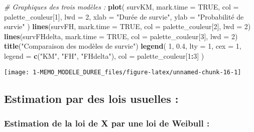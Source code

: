 \documentclass[
]{article}
\newenvironment{Shaded}{\begin{snugshade}}{\end{snugshade}}
\newcommand{\AttributeTok}[1]{\textcolor[rgb]{0.13,0.29,0.53}{#1}}
\newcommand{\CommentTok}[1]{\textcolor[rgb]{0.56,0.35,0.01}{\textit{#1}}}
\newcommand{\ConstantTok}[1]{\textcolor[rgb]{0.56,0.35,0.01}{#1}}
\newcommand{\DecValTok}[1]{\textcolor[rgb]{0.00,0.00,0.81}{#1}}
\newcommand{\FloatTok}[1]{\textcolor[rgb]{0.00,0.00,0.81}{#1}}
\newcommand{\FunctionTok}[1]{\textcolor[rgb]{0.13,0.29,0.53}{\textbf{#1}}}
\newcommand{\NormalTok}[1]{#1}
\newcommand{\SpecialCharTok}[1]{\textcolor[rgb]{0.81,0.36,0.00}{\textbf{#1}}}
\newcommand{\StringTok}[1]{\textcolor[rgb]{0.31,0.60,0.02}{#1}}
\begin{document}
\begin{Shaded}
\begin{Highlighting}[]
\CommentTok{\# Graphiques des trois modèles : }
\FunctionTok{plot}\NormalTok{(}
\NormalTok{  survKM,}
  \AttributeTok{mark.time =} \ConstantTok{TRUE}\NormalTok{,}
  \AttributeTok{col =}\NormalTok{ palette\_couleur[}\DecValTok{1}\NormalTok{],}
  \AttributeTok{lwd =} \DecValTok{2}\NormalTok{,}
  \AttributeTok{xlab =} \StringTok{"Durée de survie"}\NormalTok{,}
  \AttributeTok{ylab =} \StringTok{"Probabilité de survie"}
\NormalTok{)}
\FunctionTok{lines}\NormalTok{(survFH,}
      \AttributeTok{mark.time =} \ConstantTok{TRUE}\NormalTok{,}
      \AttributeTok{col =}\NormalTok{ palette\_couleur[}\DecValTok{2}\NormalTok{],}
      \AttributeTok{lwd =} \DecValTok{2}\NormalTok{)}
\FunctionTok{lines}\NormalTok{(survFHdelta,}
      \AttributeTok{mark.time =} \ConstantTok{TRUE}\NormalTok{,}
      \AttributeTok{col =}\NormalTok{ palette\_couleur[}\DecValTok{3}\NormalTok{],}
      \AttributeTok{lwd =} \DecValTok{2}\NormalTok{)}
\FunctionTok{title}\NormalTok{(}\StringTok{"Comparaison des modèles de survie"}\NormalTok{)}
\FunctionTok{legend}\NormalTok{(}
  \DecValTok{1}\NormalTok{,}
  \FloatTok{0.4}\NormalTok{,}
  \AttributeTok{lty =} \DecValTok{1}\NormalTok{,}
  \AttributeTok{cex =} \DecValTok{1}\NormalTok{,}
  \AttributeTok{legend =} \FunctionTok{c}\NormalTok{(}\StringTok{"KM"}\NormalTok{, }\StringTok{"FH"}\NormalTok{, }\StringTok{"FHdelta"}\NormalTok{),}
  \AttributeTok{col =}\NormalTok{ palette\_couleur[}\DecValTok{1}\SpecialCharTok{:}\DecValTok{3}\NormalTok{]}
\NormalTok{)}
\end{Highlighting}
\end{Shaded}

\begin{center}\texttt{[image: 1-MEMO\_MODELE\_DUREE\_files/figure-latex/unnamed-chunk-16-1]} \end{center}

\hypertarget{estimation-par-des-lois-usuelles}{%
\subsection{Estimation par des lois usuelles
:}\label{estimation-par-des-lois-usuelles}}

\hypertarget{estimation-de-la-loi-de-x-par-une-loi-de-weibull}{%
\subsubsection{Estimation de la loi de X par une loi de Weibull
:}\label{estimation-de-la-loi-de-x-par-une-loi-de-weibull}}
\end{document}
